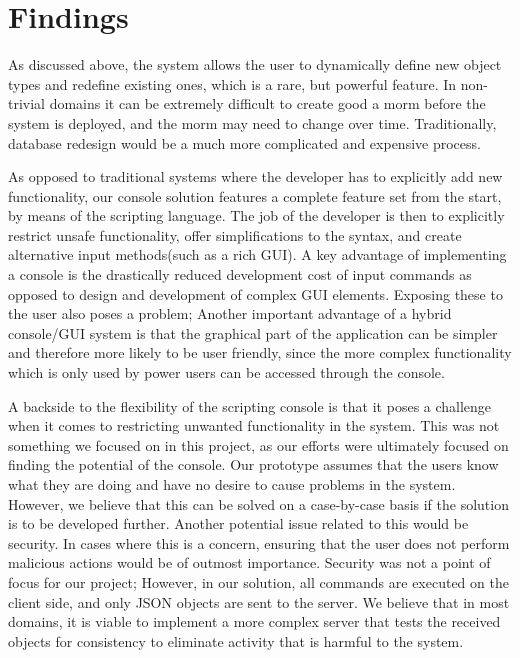 \section{Findings}
As discussed above, the system allows the user to dynamically define new object types and redefine existing ones, which is a rare, but powerful feature. In non-trivial domains it can be extremely difficult to create good a morm before the system is deployed, and the morm may need to change over time. Traditionally, database redesign would be a much more complicated and expensive process.
\cite{kroenke2006database}

As opposed to traditional systems where the developer has to explicitly add new functionality, our console solution features a complete feature set from the start, by means of the scripting language. The job of the developer is then to explicitly restrict unsafe functionality, offer simplifications to the syntax, and create alternative input methods(such as a rich GUI). A key advantage of implementing a console is the drastically reduced development cost of input commands as opposed to design and development of complex GUI elements. Exposing these to the user also poses a problem; Another important advantage of a hybrid console/GUI system is that the graphical part of the application can be simpler and therefore more likely to be user friendly, since the more complex functionality which is only used by power users can be accessed through the console.

A backside to the flexibility of the scripting console is that it poses a challenge when it comes to restricting unwanted functionality in the system. This was not something we focused on in this project, as our efforts were ultimately focused on finding the potential of the console. Our prototype assumes that the users know what they are doing and have no desire to cause problems in the system. However, we believe that this can be solved on a case-by-case basis if the solution is to be developed further. Another potential issue related to this would be security. In cases where this is a concern, ensuring that the user does not perform malicious actions would be of outmost importance. Security was not a point of focus for our project; However, in our solution, all commands are executed on the client side, and only JSON objects are sent to the server. We believe that in most domains, it is viable to implement a more complex server that tests the received objects for consistency to eliminate activity that is harmful to the system.


